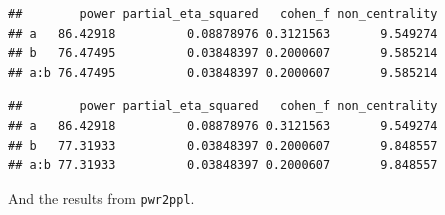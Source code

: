 \documentclass[
]{book}
\newenvironment{Shaded}{\begin{snugshade}}{\end{snugshade}}
\newcommand{\AttributeTok}[1]{\textcolor[rgb]{0.77,0.63,0.00}{#1}}
\newcommand{\ConstantTok}[1]{\textcolor[rgb]{0.00,0.00,0.00}{#1}}
\newcommand{\FunctionTok}[1]{\textcolor[rgb]{0.00,0.00,0.00}{#1}}
\newcommand{\NormalTok}[1]{#1}
\newcommand{\OtherTok}[1]{\textcolor[rgb]{0.56,0.35,0.01}{#1}}
\newcommand{\SpecialCharTok}[1]{\textcolor[rgb]{0.00,0.00,0.00}{#1}}
\newcommand{\StringTok}[1]{\textcolor[rgb]{0.31,0.60,0.02}{#1}}
\begin{document}
\begin{verbatim}
##        power partial_eta_squared   cohen_f non_centrality
## a   86.42918          0.08878976 0.3121563       9.549274
## b   76.47495          0.03848397 0.2000607       9.585214
## a:b 76.47495          0.03848397 0.2000607       9.585214
\end{verbatim}

\begin{Shaded}
\end{Shaded}

\begin{verbatim}
##        power partial_eta_squared   cohen_f non_centrality
## a   86.42918          0.08878976 0.3121563       9.549274
## b   77.31933          0.03848397 0.2000607       9.848557
## a:b 77.31933          0.03848397 0.2000607       9.848557
\end{verbatim}

And the results from \texttt{pwr2ppl}.
\end{document}
